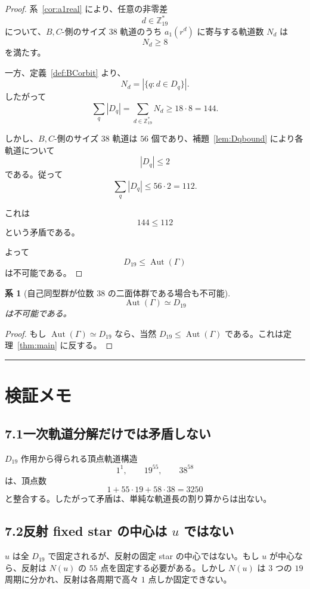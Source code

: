 \documentclass[11pt,a4paper]{article}
\theoremstyle{plain}
\newtheorem{corollary}[theorem]{系}
\theoremstyle{definition}
\theoremstyle{remark}
\DeclareMathOperator{\Aut}{Aut}
\begin{document}
\begin{proof}
系~\ref{cor:a1real} により、任意の非零差
\[
d \in \mathbb{Z}_{19}^{\ast}
\]
について、$B,C$-側のサイズ $38$ 軌道のうち $a_1(r^d)$ に寄与する軌道数 $N_d$ は
\[
N_d \ge 8
\]
を満たす。

一方、定義~\ref{def:BCorbit} より、
\[
N_d = |\{q : d \in D_q\}|.
\]
したがって
\[
\sum_{q} |D_q| = \sum_{d \in \mathbb{Z}_{19}^{\ast}} N_d \ge 18 \cdot 8 = 144.
\]

しかし、$B,C$-側のサイズ $38$ 軌道は $56$ 個であり、補題~\ref{lem:Dqbound} により各軌道について
\[
|D_q| \le 2
\]
である。従って
\[
\sum_q |D_q| \le 56 \cdot 2 = 112.
\]

これは
\[
144 \le 112
\]
という矛盾である。

よって
\[
D_{19} \le \Aut(\Gamma)
\]
は不可能である。
\end{proof}

\begin{corollary}[自己同型群が位数 $38$ の二面体群である場合も不可能]
\[
\Aut(\Gamma) \simeq D_{19}
\]
は不可能である。
\end{corollary}

\begin{proof}
もし $\Aut(\Gamma) \simeq D_{19}$ なら、当然 $D_{19} \le \Aut(\Gamma)$ である。これは定理~\ref{thm:main} に反する。
\end{proof}

\bigskip
\hrule
\bigskip

\section{検証メモ}

\subsection*{7.1\quad 一次軌道分解だけでは矛盾しない}

$D_{19}$ 作用から得られる頂点軌道構造
\[
1^1, \qquad 19^{55}, \qquad 38^{58}
\]
は、頂点数
\[
1 + 55 \cdot 19 + 58 \cdot 38 = 3250
\]
と整合する。したがって矛盾は、単純な軌道長の割り算からは出ない。

\subsection*{7.2\quad 反射 fixed star の中心は $u$ ではない}

$u$ は全 $D_{19}$ で固定されるが、反射の固定 star の中心ではない。もし $u$ が中心なら、反射は $N(u)$ の $55$ 点を固定する必要がある。しかし $N(u)$ は $3$ つの $19$ 周期に分かれ、反射は各周期で高々 $1$ 点しか固定できない。
\end{document}
